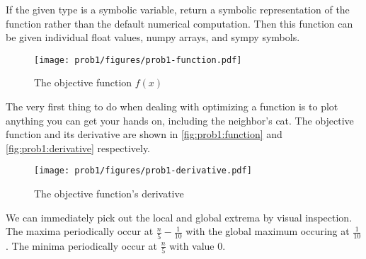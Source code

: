 \documentclass{article}
\begin{document}
If the given type is a symbolic variable, return a symbolic representation of the function rather
than the default numerical computation. Then this function can be given individual float values,
numpy arrays, and sympy symbols.

\begin{figure}[h]
    \centering
    \texttt{[image: prob1/figures/prob1-function.pdf]}
    \caption{The objective function $f(x)$}\label{fig:prob1:function}
\end{figure}

The very first thing to do when dealing with optimizing a function is to plot anything you can get
your hands on, including the neighbor's cat. The objective function and its derivative are shown in
\autoref{fig:prob1:function} and \autoref{fig:prob1:derivative} respectively.

\begin{figure}[h]
    \centering
    \texttt{[image: prob1/figures/prob1-derivative.pdf]}
    \caption{The objective function's derivative}\label{fig:prob1:derivative}
\end{figure}

We can immediately pick out the local and global extrema by visual inspection. The maxima
periodically occur at $\frac{n}{5} - \frac{1}{10}$ with the global maximum occuring at
$\frac{1}{10}$. The minima periodically occur at $\frac{n}{5}$ with value $0$.
\end{document}
